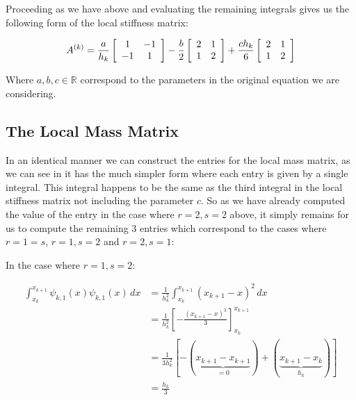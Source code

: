 Proceeding as we have above and evaluating the remaining integrals gives us the following form of the
local stiffness matrix:

\begin{equation}\label{eq:oned-determinisitic-local-stiffness}
	A^{(k)} = \frac{a}{h_k}\left[\begin{array}{c c}
    				1 & -1 \\ -1 & 1
              \end{array}\right]
              -\frac{b}{2}\left[\begin{array}{c c}
              		2 & 1\\ 1 & 2
              \end{array}\right]
              + \frac{ch_k}{6}\left[\begin{array}{c c}
              		2 & 1 \\ 1 & 2
              \end{array}\right]
\end{equation}

Where $a,b,c \in \mathbb{R}$ correspond to the parameters in the original equation
 we are considering.

\subsection{The Local Mass Matrix}

In an identical manner we can construct the entries for the local mass matrix, as we can see in
 it has the much simpler form where each entry is
given by a single integral. This integral happens to be the same as the third integral in the local
stiffness matrix not including the parameter $c$. So as we have already computed  the value of the
entry in the case where $r = 2, s = 2$ above, it simply remains for us to compute the remaining 3
entries which correspond to the cases where $r = 1 = s$, $r = 1, s = 2$ and $r = 2, s = 1$:

In the case where $r = 1, s = 2$:

\begin{align*}
	\int_{x_k}^{x_{k+1}}\psi_{k,1}(x)\psi_{k,1}(x)\, dx 
        &= \frac{1}{h_k^2}\int_{x_k}^{x_{k+1}}(x_{k+1} - x)^2\, dx \\
        &= \frac{1}{h_k^2}\left[-\frac{(x_{k+1} - x)^3}{3}\right]_{x_k}^{x_{k+1}} \\
        &= \frac{1}{3h_k^2}\left[- (\underbrace{x_{k+1} - x_{k+1}}_{=0}) +
                                 (\underbrace{x_{k+1} - x_k}_{h_k})\right] \\
        &= \frac{h_k}{3}
\end{align*}

